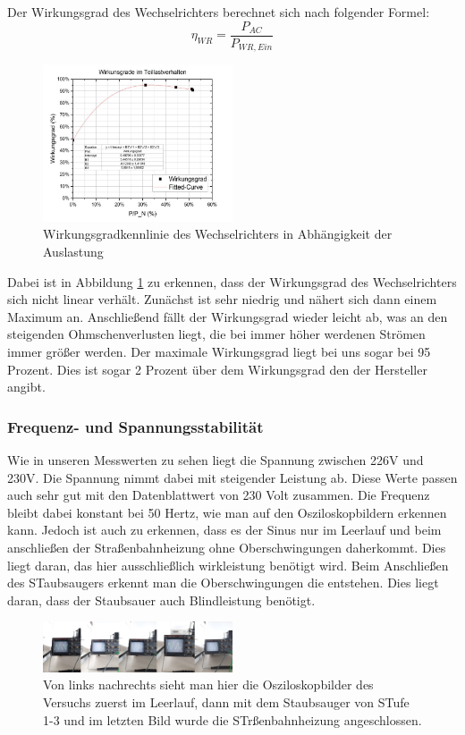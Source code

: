 Der Wirkungsgrad des Wechselrichters berechnet sich nach folgender Formel:
%
\begin{equation}
	\eta_{ WR} = \frac{ P_{AC} }{ P_{WR,Ein} }
\end{equation}
%
%
\begin{figure}[!h]
		\centering
		\includegraphics[width=0.5\textwidth]{Abbildungen/Kennlinie wr}
		\caption{Wirkungsgradkennlinie des Wechselrichters in Abhängigkeit der Auslastung}
		\label{fig:WRkennlinie}
\end{figure}
%
Dabei ist in Abbildung \ref{fig:WRkennlinie} zu erkennen, dass der Wirkungsgrad des Wechselrichters sich nicht linear verhält. Zunächst ist sehr niedrig und nähert sich dann einem Maximum an. Anschließend fällt der Wirkungsgrad wieder leicht ab, was an den steigenden Ohmschenverlusten liegt, die bei immer höher werdenen Strömen immer größer werden. Der maximale Wirkungsgrad liegt bei uns sogar bei 95 Prozent. Dies ist sogar 2 Prozent über dem Wirkungsgrad den der Hersteller angibt.
\subsubsection{Frequenz- und Spannungsstabilität}
Wie in unseren Messwerten zu sehen liegt die Spannung zwischen 226V und 230V. Die Spannung nimmt dabei mit steigender Leistung ab. Diese Werte passen auch sehr gut mit den Datenblattwert von 230 Volt zusammen. Die Frequenz bleibt dabei konstant bei 50 Hertz, wie man auf den Osziloskopbildern erkennen kann. Jedoch ist auch zu erkennen, dass es der Sinus nur im Leerlauf und beim anschließen der Straßenbahnheizung ohne Oberschwingungen daherkommt. Dies liegt daran, das hier ausschließlich wirkleistung benötigt wird. Beim Anschließen des STaubsaugers erkennt man die Oberschwingungen die entstehen. Dies liegt daran, dass der Staubsauer auch Blindleistung benötigt.
%
\begin{figure}[!h]
		\centering
		\includegraphics[width=0.5\textwidth]{Abbildungen/MergedImages}
		\caption{Von links nachrechts sieht man hier die Osziloskopbilder des Versuchs zuerst im Leerlauf, dann mit dem Staubsauger von STufe 1-3 und im letzten Bild wurde die STrßenbahnheizung angeschlossen.}
		\label{fig:oszi}
\end{figure}
%
